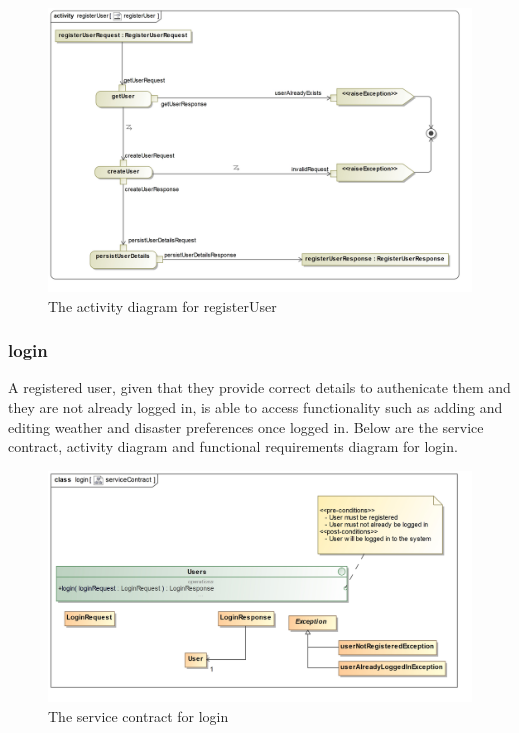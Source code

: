 \begin{figure}[H]
	\centering
	\includegraphics[scale=0.2]{../images/funcReq/registerUserActivityDiagram.jpg}
	\caption{The activity diagram for registerUser \label{overflow}}
\end{figure}

\subsubsection{login}

A registered user, given that they provide correct details to authenicate them and they are not already logged in, is able to access functionality such as adding and editing weather and disaster preferences once logged in. Below are the service contract, activity diagram and functional requirements diagram for login.

\begin{figure}[H]
	\centering
	\includegraphics[width=1.2\textwidth]{../images/funcReq/loginServiceContract.jpg}
	\caption{The service contract for login \label{overflow}}
\end{figure}

